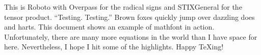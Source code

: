 \documentclass[12pt]{article}
\begin{document}
\def\footnote#1{}
\def\showabstract{0}
\let\textsf\relax
\let\ttfamily\relax
\def\documentname{Example---Roboto}



This is Roboto with Overpass for the radical signs and STIXGeneral for the tensor product. ``Testing. Testing.'' Brown foxes quickly jump over dazzling does and harts. This document shows an example of mathfont in action. Unfortunately, there are many more equations in the world than I have space for here. Nevertheless, I hope I hit some of the highlights. Happy \TeX ing!


\end{document}
